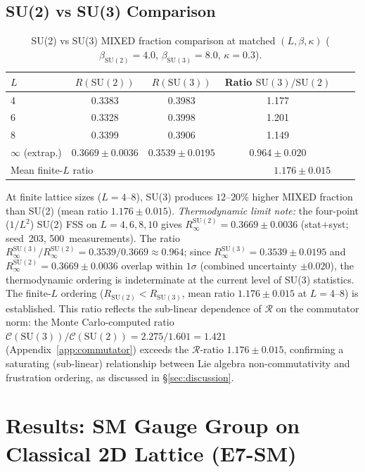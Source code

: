 \documentclass[12pt,a4paper]{article}
\newcommand{\R}{\mathcal{R}}           %
\newcommand{\SU}[1]{\mathrm{SU}(#1)}
\theoremstyle{plain}
\theoremstyle{definition}
\theoremstyle{remark}
\begin{document}
\subsection{SU(2) vs SU(3) Comparison}

\begin{table}[ht]
\centering
\caption{SU(2) vs SU(3) MIXED fraction comparison at matched $(L,\beta,\kappa)$
($\beta_{\SU{2}}=4.0$, $\beta_{\SU{3}}=8.0$, $\kappa=0.3$).}
\label{tab:su23_comparison}
\begin{tabular}{lccccc}
\toprule
$L$ & $R(\SU{2})$ & $R(\SU{3})$ & Ratio $\SU{3}/\SU{2}$ \\
\midrule
4 & 0.3383 & 0.3983 & 1.177 \\
6 & 0.3328 & 0.3998 & 1.201 \\
8 & 0.3399 & 0.3906 & 1.149 \\
$\infty$ (extrap.) & $0.3669\pm0.0036$ & $0.3539\pm0.0195$ & $0.964\pm0.020$ \\
\midrule
\multicolumn{2}{l}{Mean finite-$L$ ratio} & \multicolumn{2}{r}{$\mathbf{1.176\pm0.015}$} \\
\bottomrule
\end{tabular}
\end{table}

At finite lattice sizes ($L=4$--$8$), SU(3) produces $12$--$20\%$ higher MIXED
fraction than SU(2) (mean ratio $1.176\pm0.015$).
\emph{Thermodynamic limit note:} the four-point ($1/L^2$) SU(2) FSS on $L=4,6,8,10$ gives
$R_\infty^{\SU{2}}=0.3669\pm0.0036$ (stat$+$syst; seed~203, 500~measurements).
The ratio $R_\infty^{\SU{3}}/R_\infty^{\SU{2}}=0.3539/0.3669\approx0.964$; since
$R_\infty^{\SU{3}}=0.3539\pm0.0195$ and $R_\infty^{\SU{2}}=0.3669\pm0.0036$ overlap
within $1\sigma$ (combined uncertainty $\pm0.020$), the thermodynamic ordering is
indeterminate at the current level of SU(3) statistics. The finite-$L$ ordering
($R_{\SU{2}}<R_{\SU{3}}$, mean ratio $1.176\pm0.015$ at $L=4$--$8$) is established.
This ratio reflects the sub-linear dependence of $\R$ on the commutator norm:
the Monte Carlo-computed ratio $\mathcal{C}(\SU{3})/\mathcal{C}(\SU{2})=2.275/1.601=1.421$
(Appendix~\ref{app:commutator}) exceeds the $\R$-ratio $1.176\pm0.015$,
confirming a saturating (sub-linear) relationship between Lie algebra
non-commutativity and frustration ordering, as discussed in §\ref{sec:discussion}.

\section{Results: SM Gauge Group on Classical 2D Lattice (E7-SM)}
\label{sec:sm}
\end{document}
